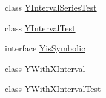 \begin{DoxyCompactItemize}
\item 
class \mbox{\hyperlink{classorg_1_1jfree_1_1data_1_1xy_1_1_y_interval_series_test}{Y\+Interval\+Series\+Test}}
\item 
class \mbox{\hyperlink{classorg_1_1jfree_1_1data_1_1xy_1_1_y_interval_test}{Y\+Interval\+Test}}
\item 
interface \mbox{\hyperlink{interfaceorg_1_1jfree_1_1data_1_1xy_1_1_yis_symbolic}{Yis\+Symbolic}}
\item 
class \mbox{\hyperlink{classorg_1_1jfree_1_1data_1_1xy_1_1_y_with_x_interval}{Y\+With\+X\+Interval}}
\item 
class \mbox{\hyperlink{classorg_1_1jfree_1_1data_1_1xy_1_1_y_with_x_interval_test}{Y\+With\+X\+Interval\+Test}}
\end{DoxyCompactItemize}
